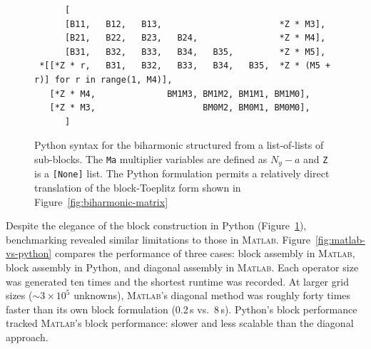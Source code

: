 \begin{figure}[h]
{\footnotesize
\begin{verbatim}
      [
      [B11,   B12,   B13,                       *Z * M3],
      [B21,   B22,   B23,   B24,                *Z * M4],
      [B31,   B32,   B33,   B34,   B35,         *Z * M5],
 *[[*Z * r,   B31,   B32,   B33,   B34,   B35,  *Z * (M5 + r)] for r in range(1, M4)],
   [*Z * M4,              BM1M3, BM1M2, BM1M1, BM1M0],
   [*Z * M3,                     BM0M2, BM0M1, BM0M0],
      ]
\end{verbatim}
}
\caption[Python syntax for the biharmonic]{Python syntax for the biharmonic structured from a list-of-lists of sub-blocks. The \texttt{Ma} multiplier variables are defined as $N_y - a$ and \texttt{Z} is a \texttt{[None]} list.
The Python formulation permits a relatively direct translation of the block-Toeplitz form shown in Figure~\ref{fig:biharmonic-matrix}}
\label{fig:python-bmat}
\end{figure}

Despite the elegance of the block construction in Python (Figure~\ref{fig:python-bmat}), benchmarking revealed similar limitations to those in M\textsc{atlab}. Figure~\ref{fig:matlab-vs-python} compares the performance of three cases: block assembly in M\textsc{atlab}, block assembly in Python, and diagonal assembly in M\textsc{atlab}. Each operator size was generated ten times and the shortest runtime was recorded. At larger grid sizes ($\sim 3\times 10^{5}$ unknowns), M\textsc{atlab}'s diagonal method was roughly forty times faster than its own block formulation (0.2\,s vs.\ 8\,s). Python’s block performance tracked M\textsc{atlab}'s block performance: slower and less scalable than the diagonal approach.

